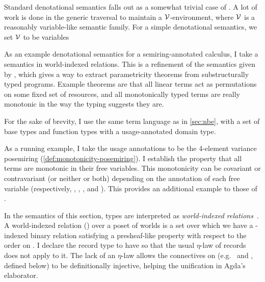 Standard denotational semantics falls out as a somewhat trivial case of
.
A lot of work is done in the generic traversal  to
maintain a $\mathcal V$-environment, where $\mathcal V$ is a reasonably variable-like semantic
family.
For a simple denotational semantics, we set $\mathcal V$ to be variables

As an example denotational semantics for a semiring-annotated calculus, I take
a semantics in world-indexed relations.
This is a refinement of the semantics given by \citet{AbelBernardy2020},
which gives a way to extract parametricity theorems from substructurally typed
programs.
Example theorems are that all linear terms act as permutations on some fixed
set of resources, and all monotonically typed terms are really monotonic in the
way the typing suggests they are.

For the sake of brevity, I use the same term language as in \cref{sec:nbe}, with
a set of base types and function types with a usage-annotated domain type.

As a running example, I take the usage annotations to be the 4-element
variance posemiring (\cref{def:monotonicity-posemiring}).
I establish the property that all terms are monotonic in their free variables.
This monotonicity can be covariant or contravariant (or neither or both)
depending on the annotation of each free variable (respectively,
\AgdaInductiveConstructor{$\uparrow\uparrow$},
\AgdaInductiveConstructor{$\downarrow\downarrow$},
\AgdaInductiveConstructor{$\wn\wn$}, and
\AgdaInductiveConstructor{\textasciitilde\textasciitilde}).
This provides an additional example to those of \citet{AbelBernardy2020}.

In the semantics of this section, types are interpreted as
\emph{world-indexed relations}~\citep{AbelBernardy2020,context-constrained}.
A world-indexed relation () over a poset of worlds
 is a set  over which
we have a -indexed binary relation  satisfying a
presheaf-like property  with respect to the order on
.
I declare the record type  to have
 so that the usual $\eta$-law of records does not
apply to it.
The lack of an $\eta$-law allows the connectives on 
(e.g.\  and ,
defined below) to be definitionally injective, helping the unification in Agda's
elaborator.


